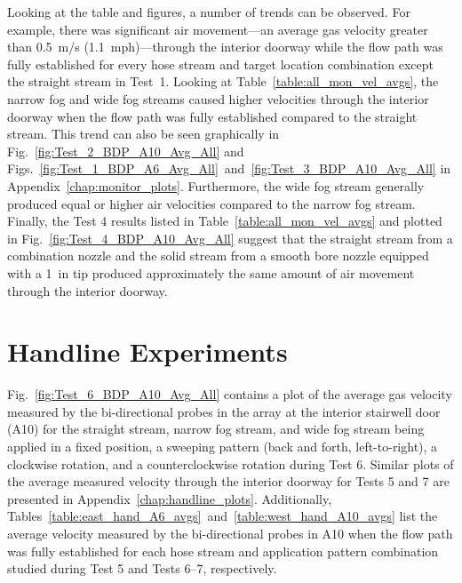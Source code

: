 \documentclass[12pt,oneside]{book}
\begin{document}
Looking at the table and figures, a number of trends can be observed. For example, there was significant air movement---an average gas velocity greater than 0.5~m/s (1.1~mph)---through the interior doorway while the flow path was fully established for every hose stream and target location combination except the straight stream in Test~1. Looking at Table~\ref{table:all_mon_vel_avgs}, the narrow fog and wide fog streams caused higher velocities through the interior doorway when the flow path was fully established compared to the straight stream. This trend can also be seen graphically in Fig.~\ref{fig:Test_2_BDP_A10_Avg_All} and Figs.~\ref{fig:Test_1_BDP_A6_Avg_All}~and~\ref{fig:Test_3_BDP_A10_Avg_All} in Appendix~\ref{chap:monitor_plots}. Furthermore, the wide fog stream generally produced equal or higher air velocities compared to the narrow fog stream. Finally, the Test 4 results listed in Table~\ref{table:all_mon_vel_avgs} and plotted in Fig.~\ref{fig:Test_4_BDP_A10_Avg_All} suggest that the straight stream from a combination nozzle and the solid stream from a smooth bore nozzle equipped with a 1~in tip produced approximately the same amount of air movement through the interior doorway.
\FloatBarrier

\section{Handline Experiments}
\label{sec:handline_results}
Fig.~\ref{fig:Test_6_BDP_A10_Avg_All} contains a plot of the average gas velocity measured by the bi-directional probes in the array at the interior stairwell door (A10) for the straight stream, narrow fog stream, and wide fog stream being applied in a fixed position, a sweeping pattern (back and forth, left-to-right), a clockwise rotation, and a counterclockwise rotation during Test 6. Similar plots of the average measured velocity through the interior doorway for Tests 5 and 7 are presented in Appendix~\ref{chap:handline_plots}. Additionally, Tables~\ref{table:east_hand_A6_avgs}~and~\ref{table:west_hand_A10_avgs} list the average velocity measured by the bi-directional probes in A10 when the flow path was fully established for each hose stream and application pattern combination studied during Test 5 and Tests 6--7, respectively.
\end{document}
